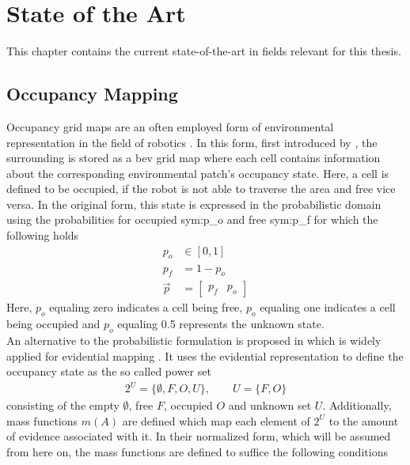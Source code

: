 
\chapter{State of the Art}
\label{ch:state_of_the_art}
This chapter contains the current state-of-the-art in fields relevant for this thesis.

%
\section{Occupancy Mapping}
\label{sec:occupancy_mapping}
Occupancy grid maps are an often employed form of environmental representation in the field of robotics \cite{carrillo2015autonomous,elfes1989using,fleuret2007multicamera}. In this form, first introduced by \cite{elfes1989using}, the surrounding is stored as a \gls{bev} grid map where each cell contains information about the corresponding environmental patch's occupancy state. Here, a cell is defined to be occupied, if the robot is not able to traverse the area and free vice versa. In the original form, this state is expressed in the probabilistic domain using the probabilities for occupied \gls{sym:p_o} and free \gls{sym:p_f} for which the following holds
\begin{align}
	p_o &\in [0,1]\\
	p_f &= 1-p_o\\
	\vec{p} &= \begin{bmatrix} p_f & p_o \end{bmatrix}
\end{align}
Here, $p_o$ equaling zero indicates a cell being free, $p_o$ equaling one indicates a cell being occupied and $p_o$ equaling 0.5 represents the unknown state.  
\\
An alternative to the probabilistic formulation is proposed in \cite{pagac1996evidential} which is widely applied for evidential mapping \cite{moras2011moving,yu2015evidential,mouhagir2017using}. It uses the evidential representation \cite{dempster1968generalization,shafer1976mathematical} to define the occupancy state as the so called power set
\begin{align}
	2^{U} = \{\emptyset, F, O, U\}, \qquad U = \{F,O\}	
\end{align}
consisting of the empty $\emptyset$, free $F$, occupied $O$ and unknown set $U$. Additionally, mass functions $m(A)$ are defined which map each element of $2^{U}$ to the amount of evidence associated with it. In their normalized form, which will be assumed from here on, the mass functions are defined to suffice the following conditions
